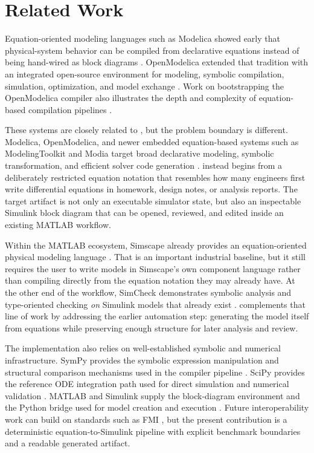 \documentclass[colorlinks,upint,subscriptcorrection,varvw,balance,nofoot]{asmeconf}
\newcommand{\EqnToSim}{\NoCaseChange{Eqn2Sim}}
\begin{document}
\section{Related Work}
Equation-oriented modeling languages such as Modelica showed early that physical-system behavior can be compiled from declarative equations instead of being hand-wired as block diagrams \cite{fritzson1998modelica}. OpenModelica extended that tradition with an integrated open-source environment for modeling, symbolic compilation, simulation, optimization, and model exchange \cite{fritzson2020openmodelica}. Work on bootstrapping the OpenModelica compiler also illustrates the depth and complexity of equation-based compilation pipelines \cite{sjolund2014bootstrapping}.

These systems are closely related to \EqnToSim{}, but the problem boundary is different. Modelica, OpenModelica, and newer embedded equation-based systems such as ModelingToolkit and Modia target broad declarative modeling, symbolic transformation, and efficient solver code generation \cite{ma2021modelingtoolkit,elmqvist2021modia}. \EqnToSim{} instead begins from a deliberately restricted equation notation that resembles how many engineers first write differential equations in homework, design notes, or analysis reports. The target artifact is not only an executable simulator state, but also an inspectable Simulink block diagram that can be opened, reviewed, and edited inside an existing MATLAB workflow.

Within the MATLAB ecosystem, Simscape already provides an equation-oriented physical modeling language \cite{mathworks2026simscape}. That is an important industrial baseline, but it still requires the user to write models in Simscape's own component language rather than compiling directly from the equation notation they may already have. At the other end of the workflow, SimCheck demonstrates symbolic analysis and type-oriented checking \emph{on} Simulink models that already exist \cite{roy2010simcheck}. \EqnToSim{} complements that line of work by addressing the earlier automation step: generating the model itself from equations while preserving enough structure for later analysis and review.

The implementation also relies on well-established symbolic and numerical infrastructure. SymPy provides the symbolic expression manipulation and structural comparison mechanisms used in the compiler pipeline \cite{meurer2017sympy}. SciPy provides the reference ODE integration path used for direct simulation and numerical validation \cite{virtanen2020scipy}. MATLAB and Simulink supply the block-diagram environment and the Python bridge used for model creation and execution \cite{mathworks2025simulink,mathworks2025python}. Future interoperability work can build on standards such as FMI \cite{fmi302}, but the present contribution is a deterministic equation-to-Simulink pipeline with explicit benchmark boundaries and a readable generated artifact.
\end{document}
